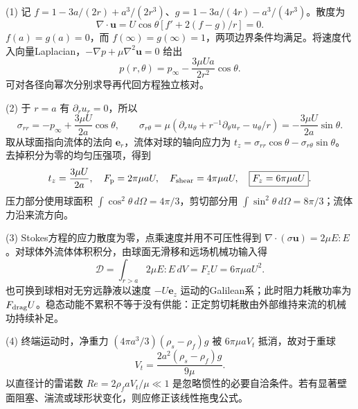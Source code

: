 (1) 记 \(f=1-3a/(2r)+a^3/(2r^3)\)、\(g=1-3a/(4r)-a^3/(4r^3)\)。散度为
\[
\nabla\!\cdot\mathbf u=U\cos\theta[f'+2(f-g)/r]=0.
\]
\(f(a)=g(a)=0\)，而 \(f(\infty)=g(\infty)=1\)，两项边界条件均满足。将速度代入向量Laplacian，\(-\nabla p+\mu\nabla^2\mathbf u=0\) 给出
\[
p(r,\theta)=p_\infty-\frac{3\mu Ua}{2r^2}\cos\theta.
\]
可对各径向幂次分别求导再代回方程独立核对。

(2) 于 \(r=a\) 有 \(\partial_ru_r=0\)，所以
\[
\sigma_{rr}=-p_\infty+\frac{3\mu U}{2a}\cos\theta,\qquad
\sigma_{r\theta}=\mu(\partial_ru_\theta+r^{-1}\partial_\theta u_r-u_\theta/r)
=-\frac{3\mu U}{2a}\sin\theta.
\]
取从球面指向流体的法向 \(\mathbf e_r\)，流体对球的轴向应力为
\(t_z=\sigma_{rr}\cos\theta-\sigma_{r\theta}\sin\theta\)。
去掉积分为零的均匀压强项，得到
\[
t_z=\frac{3\mu U}{2a},\quad
F_{\rm p}=2\pi\mu aU,\quad F_{\rm shear}=4\pi\mu aU,
\quad\boxed{F_z=6\pi\mu aU}.
\]
压力部分使用球面积 \(\int\cos^2\theta\,d\Omega=4\pi/3\)，剪切部分用 \(\int\sin^2\theta\,d\Omega=8\pi/3\)；流体力沿来流方向。

(3) Stokes方程的应力散度为零，点乘速度并用不可压性得到
\(\nabla\cdot(\sigma\mathbf u)=2\mu E:E\)。对球体外流体体积积分，由球面无滑移和远场机械功输入得
\[
\mathcal D=\int_{r>a}2\mu E:E\,dV=F_zU
=\boxed{6\pi\mu aU^2}.
\]
也可换到球相对无穷远静液以速度 \(-U\mathbf e_z\) 运动的Galilean系；此时阻力耗散功率为 \(F_{\rm drag}U\)。稳态动能不累积不等于没有供能：正定剪切耗散由外部维持来流的机械功持续补足。

(4) 终端运动时，净重力
\((4\pi a^3/3)(\rho_s-\rho_f)g\)
被 \(6\pi\mu aV_t\) 抵消，故对于重球
\[
V_t=\frac{2a^2(\rho_s-\rho_f)g}{9\mu}.
\]
以直径计的雷诺数
\(Re=2\rho_faV_t/\mu\ll1\) 是忽略惯性的必要自洽条件。若有显著壁面阻塞、湍流或球形状变化，则应修正该线性拖曳公式。
